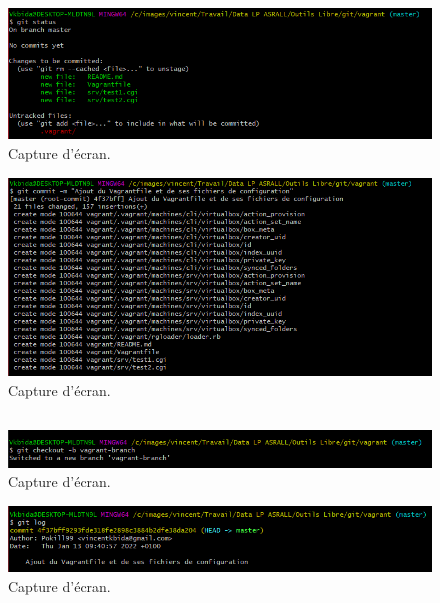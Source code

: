 \documentclass{article}
\begin{document}
\begin{figure}[h]
\centering
\includegraphics[width=\textwidth]{images/q3-1-2.png}
\caption{\label{fig:frog}Capture d'écran.}
\end{figure}

\begin{figure}[h]
\centering
\includegraphics[width=\textwidth]{images/q3-1-3.png}
\caption{\label{fig:frog}Capture d'écran.}
\end{figure}
\FloatBarrier
\subsection{}

\begin{figure}[h]
\centering
\includegraphics[width=\textwidth]{images/q3-2-1.png}
\caption{\label{fig:frog}Capture d'écran.}
\end{figure}

\begin{figure}[h]
\centering
\includegraphics[width=\textwidth]{images/q3-2-2.png}
\caption{\label{fig:frog}Capture d'écran.}
\end{figure}
\end{document}

